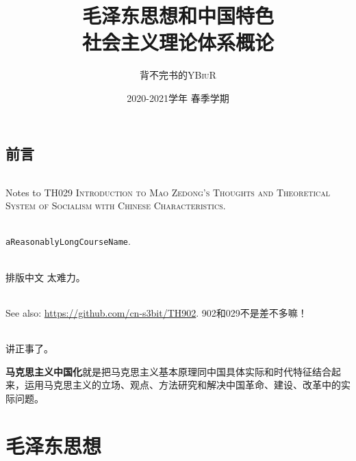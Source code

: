 \documentclass[oneside]{book}
\title{\Huge\textbf{毛泽东思想和中国特色\\社会主义理论体系概论}}
\author{背不完书的\textsc{YBiuR}}
\date{2020-2021学年{} 春季学期}
\begin{document}
\begin{spacing}{1.5}
\setlength{\parindent}{2em}

\frontmatter
\maketitle
\chapter*{前言}
\paragraph{}Notes to \textsc{TH029 Introduction to Mao Zedong's Thoughts and Theoretical System of Socialism with Chinese Characteristics}.
\paragraph{}\verb|aReasonablyLongCourseName|.
\paragraph{}排版中文 太难力。
\paragraph{}See also: \url{https://github.com/cn-s3bit/TH902}. 902和029不是差不多嘛！
\paragraph{}讲正事了。

\textbf{马克思主义中国化}就是把马克思主义基本原理同中国具体实际和时代特征结合起来，运用马克思主义的立场、观点、方法研究和解决中国革命、建设、改革中的实际问题。

\tableofcontents

\mainmatter
\part{毛泽东思想}



\end{spacing}
\end{document}
